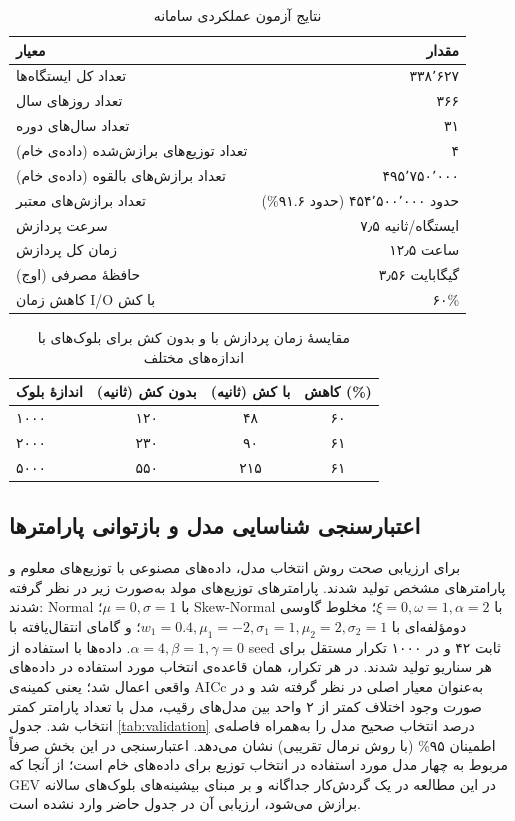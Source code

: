\documentclass[12pt,a4paper,twocolumn]{article}
\begin{document}
\begin{table}[h]
\centering
\caption{نتایج آزمون عملکردی سامانه}
\label{tab:performance}
\begin{tabular}{l r}
\toprule
\textbf{معیار} & \textbf{مقدار} \\
\midrule
تعداد کل ایستگاه‌ها & ۳۳۸٬۶۲۷ \\
تعداد روزهای سال & ۳۶۶ \\
تعداد سال‌های دوره & ۳۱ \\
تعداد توزیع‌های برازش‌شده (داده‌ی خام) & ۴ \\
تعداد برازش‌های بالقوه (داده‌ی خام) & ۴۹۵٬۷۵۰٬۰۰۰ \\
تعداد برازش‌های معتبر & حدود ۴۵۴٬۵۰۰٬۰۰۰ (حدود ۹۱.۶\%) \\
سرعت پردازش & ۷٫۵ ایستگاه/ثانیه \\
زمان کل پردازش & ۱۲٫۵ ساعت \\
حافظۀ مصرفی (اوج) & ۳٫۵۶ گیگابایت \\
کاهش زمان I/O با کش & ۶۰\% \\
\bottomrule
\end{tabular}
\end{table}

\begin{table}[h]
\centering
\caption{مقایسهٔ زمان پردازش با و بدون کش برای بلوک‌های با اندازه‌های مختلف}
\label{tab:cache}
\begin{tabular}{l c c c}
\toprule
\textbf{اندازهٔ بلوک} & \textbf{بدون کش (ثانیه)} & \textbf{با کش (ثانیه)} & \textbf{کاهش (\%)} \\
\midrule
۱۰۰۰ & ۱۲۰ & ۴۸ & ۶۰ \\
۲۰۰۰ & ۲۳۰ & ۹۰ & ۶۱ \\
۵۰۰۰ & ۵۵۰ & ۲۱۵ & ۶۱ \\
\bottomrule
\end{tabular}
\end{table}

\subsection{اعتبارسنجی شناسایی مدل و بازتوانی پارامترها}
برای ارزیابی صحت روش انتخاب مدل، داده‌های مصنوعی با توزیع‌های معلوم و پارامترهای مشخص تولید شدند. پارامترهای توزیع‌های مولد به‌صورت زیر در نظر گرفته شدند: Normal با $\mu=0,\sigma=1$؛ Skew-Normal با $\xi=0,\omega=1,\alpha=2$؛ مخلوط گاوسی دومؤلفه‌ای با $w_1=0.4,\mu_1=-2,\sigma_1=1,\mu_2=2,\sigma_2=1$؛ و گامای انتقال‌یافته با $\alpha=4,\beta=1,\gamma=0$. داده‌ها با استفاده از seed ثابت ۴۲ و در ۱۰۰۰ تکرار مستقل برای هر سناریو تولید شدند. در هر تکرار، همان قاعده‌ی انتخاب مورد استفاده در داده‌های واقعی اعمال شد؛ یعنی کمینه‌ی AICc به‌عنوان معیار اصلی در نظر گرفته شد و در صورت وجود اختلاف کمتر از ۲ واحد بین مدل‌های رقیب، مدل با تعداد پارامتر کمتر انتخاب شد. جدول \ref{tab:validation} درصد انتخاب صحیح مدل را به‌همراه فاصله‌ی اطمینان ۹۵\% (با روش نرمال تقریبی) نشان می‌دهد. اعتبارسنجی در این بخش صرفاً مربوط به چهار مدل مورد استفاده در انتخاب توزیع برای داده‌های خام است؛ از آنجا که GEV در این مطالعه در یک گردش‌کار جداگانه و بر مبنای بیشینه‌های بلوک‌های سالانه برازش می‌شود، ارزیابی آن در جدول حاضر وارد نشده است.
\end{document}
